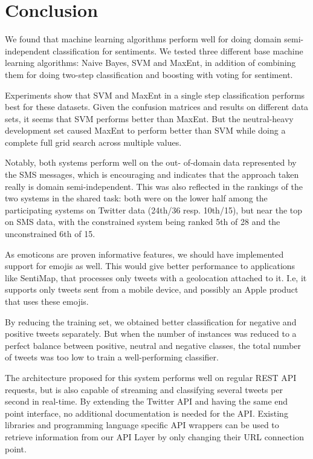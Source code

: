 \chapter{Conclusion}

We found that machine learning algorithms perform well for doing domain semi-independent classification for sentiments. We tested three different base machine learning algorithms: Naive Bayes, SVM and MaxEnt, in addition of combining them for doing two-step classification and boosting with voting for sentiment. 

Experiments show that SVM and MaxEnt in a single step classification performs best for these datasets. Given the confusion matrices and results on different data sets, it seems that SVM performs better than MaxEnt. But the neutral-heavy development set caused MaxEnt to perform better than SVM while doing a complete full grid search across multiple values.

Notably, both systems perform well on the out- of-domain data represented by the SMS messages, which is encouraging and indicates that the approach taken really is domain semi-independent. This was also reflected in the rankings of the two systems in the shared task: both were on the lower half among the participating systems on Twitter data (24th/36 resp. 10th/15), but near the top on SMS data, with the constrained system being ranked 5th of 28  and the unconstrained 6th of 15.

As emoticons are proven informative features, we should have implemented support for emojis as well. This would give better performance to applications like SentiMap, that processes only tweets with a geolocation attached to it. I.e, it supports only tweets sent from a mobile device, and possibly an Apple product that uses these emojis.

By reducing the training set, we obtained better classification for negative and positive tweets separately. But when the number of instances was reduced to a perfect balance between positive, neutral and negative classes, the total number of tweets was too low to train a well-performing classifier.

The architecture proposed for this system performs well on regular REST API requests, but is also capable of streaming and classifying several tweets per second in real-time. By extending the Twitter API and having the same end point interface, no additional documentation is needed for the API. Existing libraries and programming language specific API wrappers can be used to retrieve information from our API Layer by only changing their URL connection point. 

